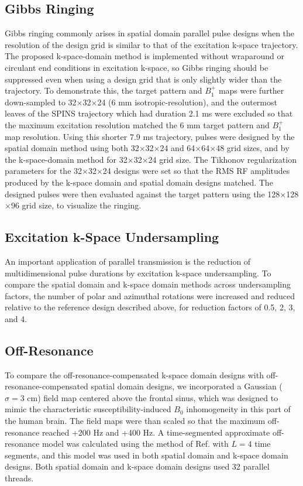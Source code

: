 \subsection*{Gibbs Ringing}
Gibbs ringing commonly arises in spatial domain parallel pulse designs when the resolution of the 
design grid is similar to that of the excitation k-space trajectory. 
The proposed k-space-domain method is implemented without wraparound or circulant end conditions in excitation k-space, 
so Gibbs ringing should be suppressed even when using a design grid that is only slightly wider than the trajectory. 
To demonstrate this, 
the target pattern and $B_1^+$ maps were further down-sampled to 32$\times$32$\times$24 (6 mm isotropic-resolution),
and the outermost leaves of the SPINS trajectory which had duration 2.1 ms were excluded so that the maximum excitation 
resolution matched the 6 mm target pattern and $B_1^+$ map resolution. 
Using this shorter 7.9 ms trajectory, 
pulses were designed by the spatial domain method using both 32$\times$32$\times$24 and 64$\times$64$\times$48 grid sizes,
and by the k-space-domain method for 32$\times$32$\times$24 grid size.
The Tikhonov regularization parameters for the 32$\times$32$\times$24 designs were set so that the RMS RF amplitudes produced 
by the k-space domain and spatial domain designs matched.
The designed pulses were then evaluated against the target pattern using the 128$\times$128$\times$96 grid size,
to visualize the ringing.

\subsection*{Excitation k-Space Undersampling}
An important application of parallel transmission is the reduction of multidimensional pulse durations by excitation k-space undersampling.
To compare the spatial domain and k-space domain methods across undersampling factors,
the number of polar and azimuthal rotations were increased and reduced relative to the reference design described above, 
for reduction factors of 0.5, 2, 3, and 4. 

\subsection*{Off-Resonance}
To compare the off-resonance-compensated k-space domain designs with off-resonance-compensated spatial domain designs,
we incorporated a Gaussian ($\sigma = 3$ cm) field map centered above the frontal sinus, 
which was designed to mimic the characteristic susceptibility-induced $B_0$ inhomogeneity in this part of the human brain. 
The field maps were than scaled so that the maximum off-resonance reached +200 Hz and +400 Hz.
A time-segmented approximate off-resonance model was calculated using the method of Ref. \cite{fessler2005toeplitz} with $L = 4$ time segments,
and this model was used in both spatial domain and k-space domain designs. 
Both spatial domain and k-space domain designs used 32 parallel threads. 


